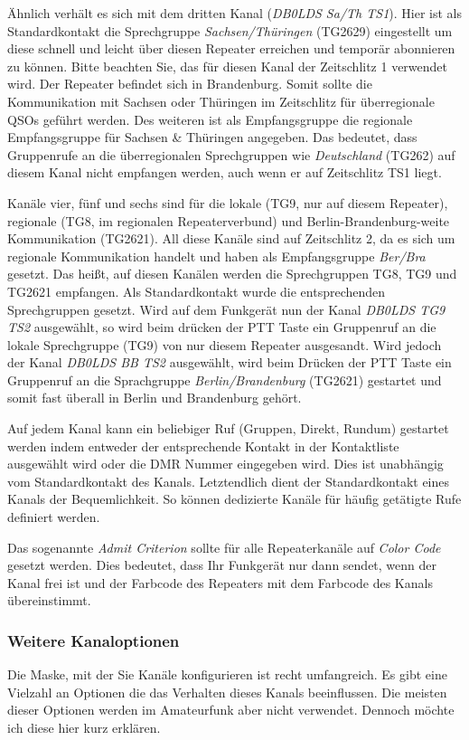 Ähnlich verhält es sich mit dem dritten Kanal (\emph{DB0LDS Sa/Th TS1}). Hier ist als Standardkontakt die Sprechgruppe \emph{Sachsen/Thüringen} (TG2629) eingestellt um diese schnell und leicht über diesen Repeater erreichen und temporär abonnieren zu können. Bitte beachten Sie, das für diesen Kanal der Zeitschlitz 1 verwendet wird. Der Repeater befindet sich in Brandenburg. Somit sollte die Kommunikation mit Sachsen oder Thüringen im Zeitschlitz für überregionale QSOs geführt werden. Des weiteren ist als Empfangsgruppe die regionale Empfangsgruppe für Sachsen \& Thüringen angegeben. Das bedeutet, dass Gruppenrufe an die überregionalen Sprechgruppen wie \emph{Deutschland} (TG262) auf diesem Kanal nicht empfangen werden, auch wenn er auf Zeitschlitz TS1 liegt.

Kanäle vier, fünf und sechs sind für die lokale (TG9, nur auf diesem Repeater), regionale (TG8, im regionalen Repeaterverbund) und Berlin-Brandenburg-weite Kommunikation (TG2621). All diese Kanäle sind auf Zeitschlitz 2, da es sich um regionale Kommunikation handelt und haben als Empfangsgruppe \emph{Ber/Bra} gesetzt. Das heißt, auf diesen Kanälen werden die Sprechgruppen TG8, TG9 und TG2621 empfangen. Als Standardkontakt wurde die entsprechenden Sprechgruppen gesetzt. Wird auf dem Funkgerät nun der Kanal \emph{DB0LDS TG9 TS2} ausgewählt, so wird beim drücken der PTT Taste ein Gruppenruf an die lokale Sprechgruppe (TG9) von nur diesem Repeater ausgesandt. Wird jedoch der Kanal \emph{DB0LDS BB TS2} ausgewählt, wird beim Drücken der PTT Taste ein Gruppenruf an die Sprachgruppe \emph{Berlin/Brandenburg} (TG2621) gestartet und somit fast überall in Berlin und Brandenburg gehört.

\begin{merke}
 Auf jedem Kanal kann ein beliebiger Ruf (Gruppen, Direkt, Rundum) gestartet werden indem entweder der entsprechende Kontakt in der Kontaktliste ausgewählt wird oder die DMR Nummer eingegeben wird. Dies ist unabhängig vom Standardkontakt des Kanals. Letztendlich dient der Standardkontakt eines Kanals der Bequemlichkeit. So können dedizierte Kanäle für häufig getätigte Rufe definiert werden.
\end{merke}

Das sogenannte \emph{Admit Criterion} sollte für alle Repeaterkanäle auf \emph{Color Code} gesetzt werden. Dies bedeutet, dass Ihr Funkgerät nur dann sendet, wenn der Kanal frei ist und der Farbcode des Repeaters mit dem Farbcode des Kanals übereinstimmt.

\subsubsection{Weitere Kanaloptionen}
Die Maske, mit der Sie Kanäle konfigurieren ist recht umfangreich. Es gibt eine Vielzahl an Optionen die das Verhalten dieses Kanals beeinflussen. Die meisten dieser Optionen werden im Amateurfunk aber nicht verwendet. Dennoch möchte ich diese hier kurz erklären.

